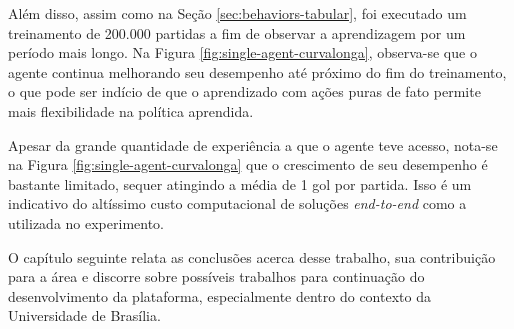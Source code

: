 Além disso, assim como na Seção \ref{sec:behaviors-tabular}, foi executado um treinamento de 200.000 partidas a fim de observar a aprendizagem por um período mais longo. Na Figura \ref{fig:single-agent-curvalonga}, observa-se que o agente continua melhorando seu desempenho até próximo do fim do treinamento, o que pode ser indício de que o aprendizado com ações puras de fato permite mais flexibilidade na política aprendida.

Apesar da grande quantidade de experiência a que o agente teve acesso, nota-se na Figura \ref{fig:single-agent-curvalonga} que o crescimento de seu desempenho é bastante limitado, sequer atingindo a média de 1 gol por partida. Isso é um indicativo do altíssimo custo computacional de soluções \textit{end-to-end} como a utilizada no experimento.

O capítulo seguinte relata as conclusões acerca desse trabalho, sua contribuição para a área e discorre sobre possíveis trabalhos para continuação do desenvolvimento da plataforma, especialmente dentro do contexto da Universidade de Brasília.


 


